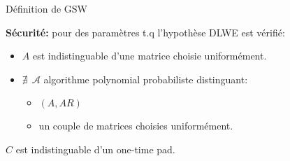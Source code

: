 \documentclass[10pt,xcolor={usenames,dvipsnames}]{beamer}
\begin{document}
\begin{section}{Définition de GSW}
\begin{frame}
\textbf{Sécurité:} pour des paramètres t.q l'hypothèse DLWE est vérifié:\\
\begin{itemize}
\item $A$ est indistinguable d'une matrice choisie uniformément. 
\item $\nexists\:\: \mathcal{A}$ algorithme polynomial probabiliste distinguant:
	\begin{itemize}
	\item $(A,AR)$ 
	\item un couple de matrices choisies uniformément.
	\end{itemize}
\end{itemize}

$C$ est indistinguable d'un one-time pad.
\end{frame} 


\end{section}
\end{document}
